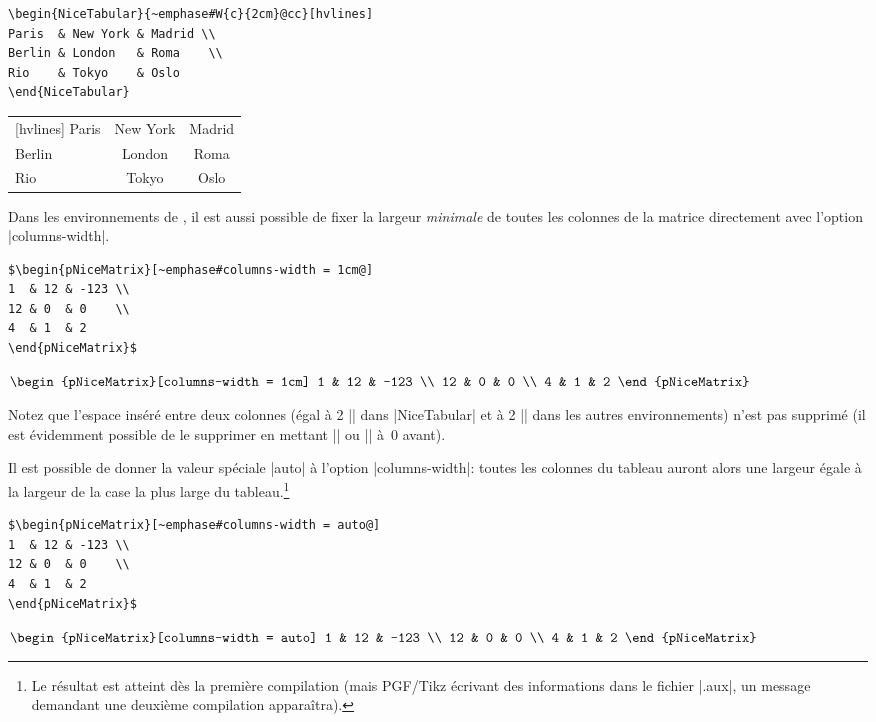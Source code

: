 \documentclass[dvipsnames]{article}%
\begin{document}
\medskip
\begin{BVerbatim}[baseline=c,boxwidth=9cm]
\begin{NiceTabular}{~emphase#W{c}{2cm}@cc}[hvlines]
Paris  & New York & Madrid \\
Berlin & London   & Roma    \\
Rio    & Tokyo    & Oslo 
\end{NiceTabular}
\end{BVerbatim}
\begin{NiceTabular}{W{c}{2cm}cc}[hvlines]
Paris  & New York & Madrid \\
Berlin & London   & Roma    \\
Rio    & Tokyo    & Oslo 
\end{NiceTabular}


\bigskip
Dans les environnements de , il est aussi possible de fixer la
largeur \emph{minimale} de toutes les colonnes de la matrice directement avec
l'option |columns-width|.

\medskip
\begin{BVerbatim}[baseline=c,boxwidth=10cm]
$\begin{pNiceMatrix}[~emphase#columns-width = 1cm@]
1  & 12 & -123 \\
12 & 0  & 0    \\
4  & 1  & 2 
\end{pNiceMatrix}$
\end{BVerbatim}
$\begin{pNiceMatrix}[columns-width = 1cm]
1  & 12 & -123 \\
12 & 0  & 0    \\
4  & 1  & 2 
\end{pNiceMatrix}$

\medskip
Notez que l'espace inséré entre deux colonnes (égal à 2 |\tabcolsep| dans
|{NiceTabular}| et à 2 |\arraycolsep| dans les autres environnements) n'est pas
supprimé (il est évidemment possible de le supprimer en mettant |\tabcolsep| ou
|\arraycolsep| à~$0$ avant).

\bigskip
Il est possible de donner la valeur spéciale |auto| à l'option |columns-width|:
toutes les colonnes du tableau auront alors une largeur égale à la largeur de la
case la plus large du tableau.\footnote{Le résultat est atteint dès la première
  compilation (mais PGF/Tikz écrivant des informations dans le fichier |.aux|,
  un message demandant une deuxième compilation apparaîtra).}\par\nobreak

\medskip
\begin{BVerbatim}[baseline=c,boxwidth=10cm]
$\begin{pNiceMatrix}[~emphase#columns-width = auto@]
1  & 12 & -123 \\
12 & 0  & 0    \\
4  & 1  & 2 
\end{pNiceMatrix}$
\end{BVerbatim}
$\begin{pNiceMatrix}[columns-width = auto]
1  & 12 & -123 \\
12 & 0  & 0    \\
4  & 1  & 2 
\end{pNiceMatrix}$
\end{document}
